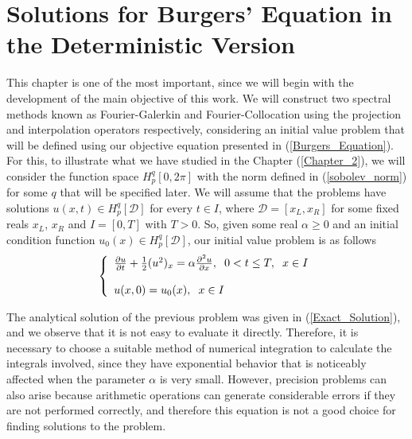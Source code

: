 \chapter{Solutions for Burgers' Equation in the Deterministic Version}
\label{Chapter_3} 
	
	This chapter is one of the most important, since we will begin with the development of the main objective of this work. We will construct two spectral methods known as Fourier-Galerkin and Fourier-Collocation using the projection and interpolation operators respectively, considering an initial value problem that will be defined using our objective equation presented in (\ref{Burgers_Equation}). \\
	
	For this, to illustrate what we have studied in the Chapter (\ref{Chapter_2}), we will consider the function space $H^q_p [0, 2 \pi]$ with the norm defined in (\ref{sobolev_norm}) for some $q$ that will be specified later. We will assume that the problems have solutions $u(x, t) \in H^q_p [\mathcal{D}]$ for every $t \in I$, where $\mathcal{D} = [x_L, x_R]$ for some fixed reals $ x_L $, $ x_R $ and $I = [0, T]$ with $T> 0$. So, given some real $\alpha \geq 0$ and an initial condition function $u_0 (x) \in H^q_p [\mathcal{D}]$, our initial value problem is as follows
	\begin{align}
	\label{IVP_Burgers}
		\left \lbrace \begin{array}{ll}
			\frac{\partial u}{\partial t} + \frac{1}{2} (u^2)_x = \alpha \frac{\partial^2 u}{\partial x}, \hspace{2mm} 0 < t \leq T, \hspace{2mm} x \in I \\
			\\
			u(x, 0) = u_0(x), \hspace{2mm} x \in I
		\end{array}  \right .
	\end{align}
	
	The analytical solution of the previous problem was given in (\ref{Exact_Solution}), and we observe that it is not easy to evaluate it directly. Therefore, it is necessary to choose a suitable method of numerical integration to calculate the integrals involved, since they have exponential behavior that is noticeably affected when the parameter $\alpha$ is very small. However, precision problems can also arise because arithmetic operations can generate considerable errors if they are not performed correctly, and therefore this equation is not a good choice for finding solutions to the problem. \\
	

